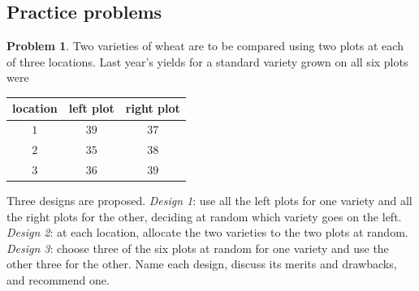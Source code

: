 \documentclass[11pt,a4paper]{article}
\numberwithin{equation}{section}
\theoremstyle{definition}
\newtheorem{problemx}{Problem}[subsection]
\newenvironment{problem}{\begin{problemx}}{\end{problemx}}
\begin{document}
\subsection{Practice problems}

\begin{problem}
Two varieties of wheat are to be compared using two plots at each of three locations. Last year's yields for a standard variety grown on all six
plots were
\begin{center}
\begin{tabular}{c|cc}
location & left plot & right plot \\
\hline
$1$ & $39$ & $37$ \\
$2$ & $35$ & $38$ \\
$3$ & $36$ & $39$
\end{tabular}
\end{center}
Three designs are proposed. \emph{Design 1}: use all the left plots for one variety and all the right plots for the other, deciding at random which
variety goes on the left. \emph{Design 2}: at each location, allocate the two varieties to the two plots at random. \emph{Design 3}: choose three of the six
plots at random for one variety and use the other three for the other. Name each design, discuss its merits and drawbacks, and recommend one.
\end{problem}
\end{document}
